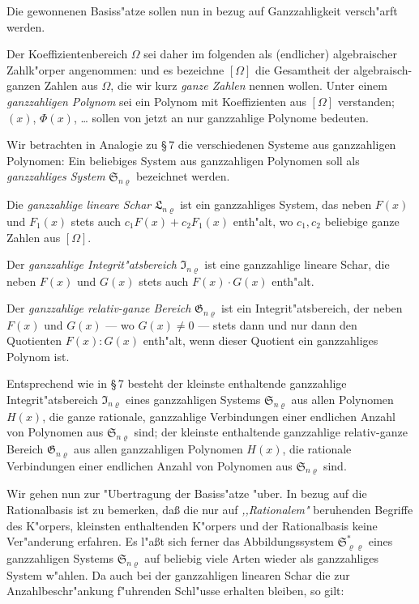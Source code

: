 \documentclass[11pt,a4paper]{article}
\begin{document}
Die gewonnenen Basiss"{a}tze sollen nun in bezug auf Ganzzahligkeit
versch"{a}rft werden.

Der Koeffizientenbereich $\Omega$ sei daher im folgenden als (endlicher)
algebraischer Zahlk"{o}rper angenommen: und es bezeichne $[\Omega]$ die
Gesamtheit der algebraisch-ganzen Zahlen aus $\Omega$, die wir kurz \emph{ganze
Zahlen} nennen wollen. Unter einem \emph{ganzzahligen Polynom} sei ein Polynom
mit Koeffizienten aus $[\Omega]$ verstanden; $(x)$, $\Phi(x)$, \dots{} sollen von jetzt
an nur ganzzahlige Polynome bedeuten.

Wir betrachten in Analogie zu \S\,7 die verschiedenen Systeme aus
ganzzahligen Polynomen: Ein beliebiges System aus ganzzahligen Polynomen
soll als \emph{ganzzahliges System} $\mathfrak{S}_{n\varrho}$ bezeichnet werden.

Die \emph{ganzzahlige lineare Schar} $\mathfrak{L}_{n\varrho}$ ist ein ganzzahliges System, das neben
$F(x)$ und $F_{1}(x)$ stets auch $c_{1}F(x)+c_{2}F_{1}(x)$ enth"{a}lt, wo $c_{1},c_{2}$
beliebige ganze Zahlen aus $[\Omega]$.

Der \emph{ganzzahlige Integrit"{a}tsbereich} $\mathfrak{I}_{n\varrho}$ ist eine ganzzahlige lineare Schar,
die neben $F(x)$ und $G(x)$ stets auch $F(x)\cdot G(x)$ enth"{a}lt.

Der \emph{ganzzahlige relativ-ganze Bereich} $\mathfrak{G}_{n\varrho}$ ist ein Integrit"{a}tsbereich,
der neben $F(x)$ und $G(x)$ --- wo $G(x)\neq 0$ --- stets dann und nur dann
den Quotienten $F(x):G(x)$ enth"{a}lt, wenn dieser Quotient ein ganzzahliges
Polynom ist.

Entsprechend wie in \S\,7 besteht der kleinste enthaltende ganzzahlige
Integrit"{a}tsbereich $\mathfrak{I}_{n\varrho}$ eines ganzzahligen Systems $\mathfrak{S}_{n\varrho}$ aus allen Polynomen
$H(x)$, die ganze rationale, ganzzahlige Verbindungen einer endlichen Anzahl
von Polynomen aus $\mathfrak{S}_{n\varrho}$ sind; der kleinste enthaltende ganzzahlige relativ-ganze
Bereich $\mathfrak{G}_{n\varrho}$ aus allen ganzzahligen Polynomen $H(x)$, die rationale
Verbindungen einer endlichen Anzahl von Polynomen aus $\mathfrak{S}_{n\varrho}$ sind.

Wir gehen nun zur "{U}bertragung der Basiss"{a}tze "{u}ber. In bezug auf
die Rationalbasis ist zu bemerken, da\ss{} die nur auf \emph{,,Rationalem"{}} beruhenden
Begriffe des K"{o}rpers, kleinsten enthaltenden K"{o}rpers und der Rationalbasis
keine Ver"{a}nderung erfahren. Es l"{a}\ss{}t sich ferner das Abbildungssystem
$\mathfrak{S}_{\varrho\varrho}^{*}$ eines ganzzahligen Systems $\mathfrak{S}_{n\varrho}$ auf beliebig viele Arten wieder als
ganzzahliges System w"{a}hlen. Da auch bei der ganzzahligen linearen Schar
die zur Anzahlbeschr"{a}nkung f"{u}hrenden Schl"{u}sse erhalten bleiben, so gilt:
\end{document}
